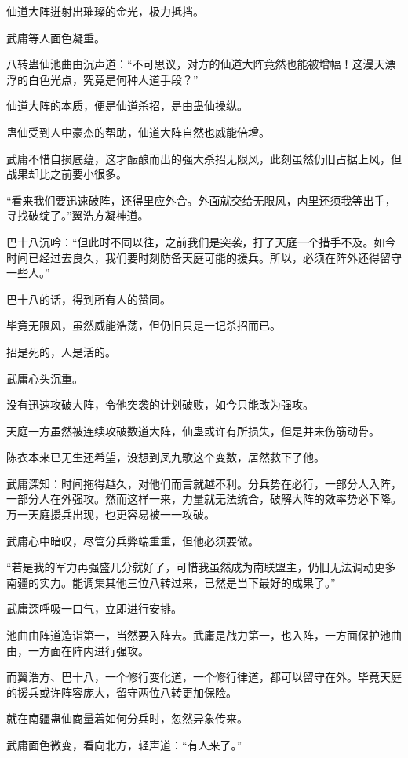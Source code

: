\begin{this_body}
仙道大阵迸射出璀璨的金光，极力抵挡。

武庸等人面色凝重。

八转蛊仙池曲由沉声道：“不可思议，对方的仙道大阵竟然也能被增幅！这漫天漂浮的白色光点，究竟是何种人道手段？”

仙道大阵的本质，便是仙道杀招，是由蛊仙操纵。

蛊仙受到人中豪杰的帮助，仙道大阵自然也威能倍增。

武庸不惜自损底蕴，这才酝酿而出的强大杀招无限风，此刻虽然仍旧占据上风，但战果却比之前要小很多。

“看来我们要迅速破阵，还得里应外合。外面就交给无限风，内里还须我等出手，寻找破绽了。”翼浩方凝神道。

巴十八沉吟：“但此时不同以往，之前我们是突袭，打了天庭一个措手不及。如今时间已经过去良久，我们要时刻防备天庭可能的援兵。所以，必须在阵外还得留守一些人。”

巴十八的话，得到所有人的赞同。

毕竟无限风，虽然威能浩荡，但仍旧只是一记杀招而已。

招是死的，人是活的。

武庸心头沉重。

没有迅速攻破大阵，令他突袭的计划破败，如今只能改为强攻。

天庭一方虽然被连续攻破数道大阵，仙蛊或许有所损失，但是并未伤筋动骨。

陈衣本来已无生还希望，没想到凤九歌这个变数，居然救下了他。

武庸深知：时间拖得越久，对他们而言就越不利。分兵势在必行，一部分人入阵，一部分人在外强攻。然而这样一来，力量就无法统合，破解大阵的效率势必下降。万一天庭援兵出现，也更容易被一一攻破。

武庸心中暗叹，尽管分兵弊端重重，但他必须要做。

“若是我的军力再强盛几分就好了，可惜我虽然成为南联盟主，仍旧无法调动更多南疆的实力。能调集其他三位八转过来，已然是当下最好的成果了。”

武庸深呼吸一口气，立即进行安排。

池曲由阵道造诣第一，当然要入阵去。武庸是战力第一，也入阵，一方面保护池曲由，一方面在阵内进行强攻。

而翼浩方、巴十八，一个修行变化道，一个修行律道，都可以留守在外。毕竟天庭的援兵或许阵容庞大，留守两位八转更加保险。

就在南疆蛊仙商量着如何分兵时，忽然异象传来。

武庸面色微变，看向北方，轻声道：“有人来了。”


\end{this_body}
